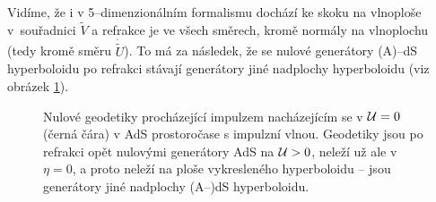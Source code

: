 Vidíme, že i v 5--dimenzionálním formalismu dochází ke skoku na vlnoploše v~souřadnici $\tilde{V}$ a refrakce je ve všech směrech, kromě normály na vlnoplochu (tedy kromě směru $\dot{\tilde{U}}$).
To má za následek, že se nulové generátory (A)--dS hyperboloidu po refrakci stávají generátory jiné nadplochy hyperboloidu (viz obrázek \ref{fig:jina_nadplocha}).

\begin{figure}[H]
    \centering
    \caption{Nulové geodetiky procházející impulzem nacházejícím se v $\mathcal{U}=0$ (černá čára) v AdS prostoročase s impulzní vlnou.
    Geodetiky jsou po refrakci opět nulovými generátory AdS na $\mathcal{U} > 0$, neleží už ale v $\eta = 0$, a proto
    neleží na ploše vykresleného hyperboloidu -- jsou generátory jiné nadplochy (A--)dS hyperboloidu.}
    \label{fig:jina_nadplocha}
\end{figure}


